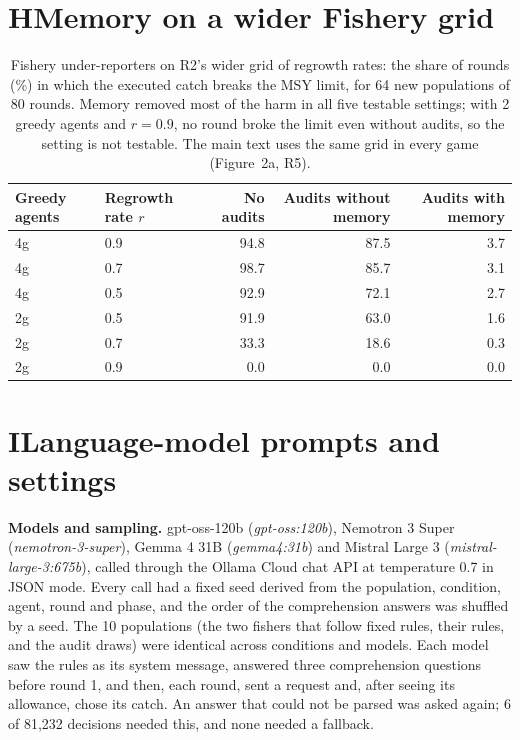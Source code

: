 \documentclass[10pt,letterpaper]{article}
\begin{document}
\section*{H\quad Memory on a wider Fishery grid}
\begin{table}[!ht]
  \centering\small
  \caption{Fishery under-reporters on R2's wider grid of regrowth rates: the share of rounds (\%) in which the executed catch breaks the MSY limit, for 64 new populations of 80 rounds. Memory removed most of the harm in all five testable settings; with 2 greedy agents and $r=0.9$, no round broke the limit even without audits, so the setting is not testable. The main text uses the same grid in every game (Figure~2a, R5).}
  \begin{tabular}{llrrr}
\toprule
Greedy agents & Regrowth rate $r$ & No audits & Audits without memory & Audits with memory \\
\midrule
4g & 0.9 & 94.8 & 87.5 & 3.7 \\
4g & 0.7 & 98.7 & 85.7 & 3.1 \\
4g & 0.5 & 92.9 & 72.1 & 2.7 \\
2g & 0.5 & 91.9 & 63.0 & 1.6 \\
2g & 0.7 & 33.3 & 18.6 & 0.3 \\
2g & 0.9 & 0.0 & 0.0 & 0.0 \\
\bottomrule
\end{tabular}

\end{table}

\FloatBarrier
\section*{I\quad Language-model prompts and settings}
\sloppy
\textbf{Models and sampling.} gpt-oss-120b (\emph{gpt-oss:120b}), Nemotron 3 Super (\emph{nemotron-3-super}), Gemma 4 31B (\emph{gemma4:31b}) and Mistral Large 3 (\emph{mistral-large-3:675b}), called through the Ollama Cloud chat API at temperature 0.7 in JSON mode. Every call had a fixed seed derived from the population, condition, agent, round and phase, and the order of the comprehension answers was shuffled by a seed. The 10 populations (the two fishers that follow fixed rules, their rules, and the audit draws) were identical across conditions and models. Each model saw the rules as its system message, answered three comprehension questions before round 1, and then, each round, sent a request and, after seeing its allowance, chose its catch. An answer that could not be parsed was asked again; 6 of 81{,}232 decisions needed this, and none needed a fallback.
\end{document}
